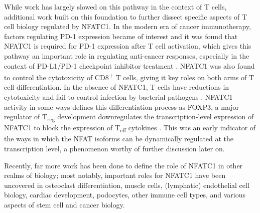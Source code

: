 While work has largely slowed on this pathway in the context of T cells, additional work built on this foundation to further dissect specific aspects of T cell biology regulated by NFATC1. In the modern era of cancer immunotherapy, factors regulating PD\hyp{}1 expression became of interest and it was found that NFATC1 is required for PD\hyp{}1 expression after T cell activation, which gives this pathway an important role in regulating anti\hyp{}cancer responses, especially in the context of PD\hyp{}L1/PD\hyp{}1 checkpoint inhibitor treatment \citep{Oestreich2008}. NFATC1 was also found to control the cytotoxicity of CD8\textsuperscript{+} T cells, giving it key roles on both arms of T cell differentiation. In the absence of NFATC1, T cells have reductions in cytotoxicity and fail to control infection by bacterial pathogens \citep{KleinHessling2017}. NFATC1 activity in some ways defines this differentiation process as FOXP3, a major regulator of T\textsubscript{reg} development downregulates the transcription\hyp{}level expression of NFATC1 to block the expression of T\textsubscript{eff} cytokines \citep{Torgerson2009}. This was an early indicator of the ways in which the NFAT isoforms can be dynamically regulated at the transcription level, a phenomenon worthy of further discussion later on.

Recently, far more work has been done to define the role of NFATC1 in other realms of biology; most notably, important roles for NFATC1 have been uncovered in osteoclast differentiation, muscle cells, (lymphatic) endothelial cell biology, cardiac development, podocytes, other immune cell types, and various aspects of stem cell and cancer biology.

